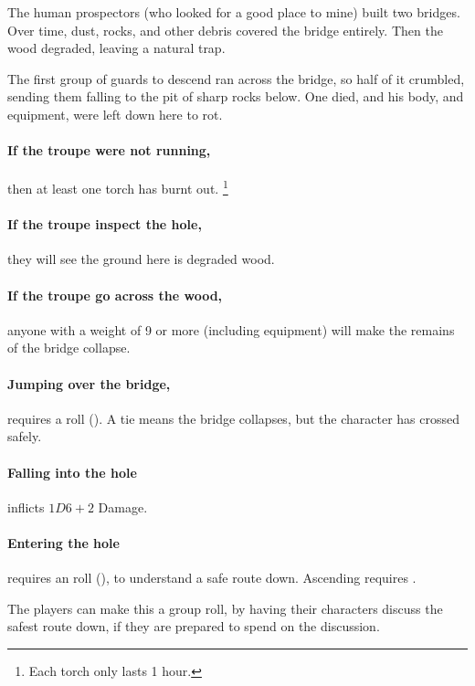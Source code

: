 \begin{multicols}{2}
\begin{exampletext}
  The human prospectors (who looked for a good place to mine) built two bridges.
  Over time, dust, rocks, and other debris covered the bridge entirely.
  Then the wood degraded, leaving a natural trap.

  The first group of \glspl{guard} to descend ran across the bridge, so half of it crumbled, sending them falling to the pit of sharp rocks below.
  One died, and his body, and equipment, were left down here to rot.
\end{exampletext}

\paragraph{If the troupe were not running,}
then at least one torch has burnt out.%
\footnote{Each torch only lasts 1 hour.}

\paragraph{If the troupe inspect the hole,}
they will see the ground here is degraded wood.

\paragraph{If the troupe go across the wood,}
anyone with a \gls{weight} of 9 or more (including equipment) will make the remains of the bridge collapse.

\paragraph{Jumping over the bridge,}
requires a  roll (\tn[9]).
A tie means the bridge collapses, but the character has crossed safely.

\paragraph{Falling into the hole}
inflicts $1D6+2$ Damage.

\paragraph{Entering the hole}
requires an  roll (\tn[10]), to understand a safe route down.
Ascending requires \tn[12].

The players can make this a group roll, by having their characters discuss the safest route down, if they are prepared to spend  on the discussion.


\end{multicols}

